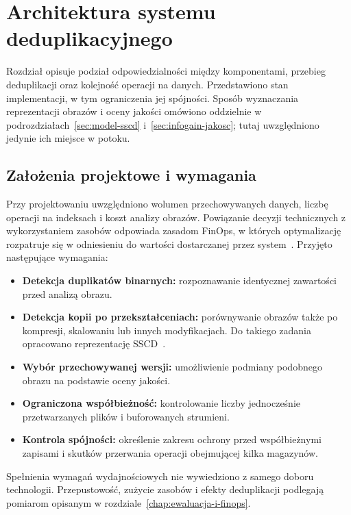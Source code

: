 \clearpage
\section{Architektura systemu deduplikacyjnego}
\label{sec:architektura-systemu}

Rozdział opisuje podział odpowiedzialności między komponentami,
przebieg deduplikacji oraz kolejność operacji na danych.
Przedstawiono stan implementacji, w tym ograniczenia jej spójności.
Sposób wyznaczania reprezentacji obrazów i oceny jakości omówiono
oddzielnie w podrozdziałach~\ref{sec:model-sscd}
i~\ref{sec:infogain-jakosc}; tutaj uwzględniono jedynie ich miejsce
w potoku.

\subsection{Założenia projektowe i wymagania}

Przy projektowaniu uwzględniono wolumen przechowywanych danych,
liczbę operacji na indeksach i koszt analizy obrazów.
Powiązanie decyzji technicznych z wykorzystaniem zasobów odpowiada
zasadom FinOps, w których optymalizację rozpatruje się w odniesieniu
do wartości dostarczanej przez system~\cite{finops_principles}.
Przyjęto następujące wymagania:

\begin{itemize}
    \item \textbf{Detekcja duplikatów binarnych:}
    rozpoznawanie identycznej zawartości przed analizą obrazu.
    \item \textbf{Detekcja kopii po przekształceniach:}
    porównywanie obrazów także po kompresji, skalowaniu lub innych
    modyfikacjach. Do takiego zadania opracowano reprezentację
    SSCD~\cite{pizzi2022sscd,sscd_repo}.
    \item \textbf{Wybór przechowywanej wersji:}
    umożliwienie podmiany podobnego obrazu na podstawie oceny jakości.
    \item \textbf{Ograniczona współbieżność:}
    kontrolowanie liczby jednocześnie przetwarzanych plików
    i buforowanych strumieni.
    \item \textbf{Kontrola spójności:}
    określenie zakresu ochrony przed współbieżnymi zapisami
    i skutków przerwania operacji obejmującej kilka magazynów.
\end{itemize}

Spełnienia wymagań wydajnościowych nie wywiedziono z samego doboru
technologii. Przepustowość, zużycie zasobów i efekty deduplikacji
podlegają pomiarom opisanym w rozdziale~\ref{chap:ewaluacja-i-finops}.

